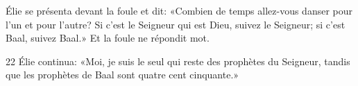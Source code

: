 Élie se présenta devant la foule et dit: «Combien de temps allez-vous danser pour l’un et pour l’autre? Si c’est le Seigneur qui est Dieu, suivez le Seigneur; si c’est Baal, suivez Baal.» Et la foule ne répondit mot.

22 Élie continua: «Moi, je suis le seul qui reste des prophètes du Seigneur, tandis que les prophètes de Baal sont quatre cent cinquante.»
